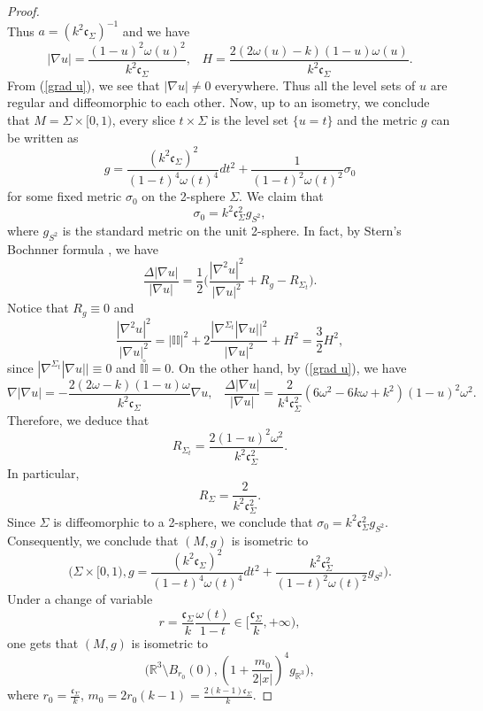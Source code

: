 \documentclass[12pt]{article}
\theoremstyle{definition}
\theoremstyle{plain}
\numberwithin{equation}{section}
\begin{document}
\begin{proof}
$$$$
Thus $ a=(k^{2}\mathfrak{c}_{\Sigma})^{-1} $ and we have
\begin{equation}\label{grad u}
|\nabla u|=\frac{(1-u)^{2}\omega(u)^{2}}{k^{2}\mathfrak{c}_{\Sigma}},\,\,\,\,\,H=\frac{2(2\omega(u)-k)(1-u)\omega(u)}{k^{2}\mathfrak{c}_{\Sigma}}.
\end{equation}
From (\ref{grad u}), we see that $ |\nabla u|\neq 0 $  everywhere. Thus all the level sets of $ u $ are regular and diffeomorphic to each other. Now, up to an isometry, we conclude that $ M=\Sigma \times [0,1)  $, every slice $ {t}\times \Sigma $ is the level set $ \{u=t\} $ and the metric $ g $ can be written as 
$$
g=\frac{(k^{2}\mathfrak{c}_{\Sigma})^{2}}{(1-t)^{4}\omega(t)^{4}}dt^{2}+\frac{1}{(1-t)^{2}\omega(t)^{2}}\sigma_{0}
$$
for some fixed metric $ \sigma_{0} $ on the 2-sphere $ \Sigma $. We claim that 
$$
\sigma_{0}=k^{2}\mathfrak{c}_{\Sigma}^{2}g_{S^{2}},
$$
where $ g_{S^{2}} $ is the standard metric on the unit 2-sphere. In fact, by Stern's Bochnner formula \cite{Stern}, we have 
$$
\frac{\Delta |\nabla u|}{|\nabla u|}=\frac{1}{2}\Big(\frac{|\nabla^{2}u|^{2}}{|\nabla u|^{2}}+R_{g}-R_{\Sigma_{t}}\Big).
$$
Notice that $ R_{g}\equiv 0 $ and 
$$
\frac{|\nabla^{2}u|^{2}}{|\nabla u|^{2}}=|\mathbb{II}|^{2}+2\frac{|\nabla^{\Sigma_{t}}|\nabla u||^{2}}{|\nabla u|^{2}}+H^{2}=\frac{3}{2}H^{2},
$$
since $ |\nabla^{\Sigma_{t}}|\nabla u||\equiv0 $ and $ \overset{\circ}{\mathbb{II}}=0 $. On the other hand, by (\ref{grad u}), we have 
$$
\nabla |\nabla u|=-\frac{2(2\omega-k)(1-u)\omega}{k^{2}\mathfrak{c}_{\Sigma}}\nabla u,\,\,\,\,\,\frac{\Delta |\nabla u|}{|\nabla u|}=\frac{2}{k^{4}\mathfrak{c}_{\Sigma}^{2}}(6\omega^{2}-6k\omega+k^{2})(1-u)^{2}\omega^{2}.
$$
Therefore, we deduce that 
$$
R_{\Sigma_{t}}=\frac{2(1-u)^{2}\omega^{2}}{k^{2}\mathfrak{c}_{\Sigma}^{2}}.
$$
In particular, 
$$ 
R_{\Sigma}=\frac{2}{k^{2}\mathfrak{c}_{\Sigma}^{2}}. 
$$
Since $ \Sigma $ is diffeomorphic to a 2-sphere, we conclude that $
\sigma_{0}=k^{2}\mathfrak{c}_{\Sigma}^{2}g_{S^{2}} $. Consequently, we conclude that $ (M,g) $ is isometric to   
$$
\Big(\Sigma \times [0,1), g=\frac{(k^{2}\mathfrak{c}_{\Sigma})^{2}}{(1-t)^{4}\omega(t)^{4}}dt^{2}+\frac{k^{2}\mathfrak{c}_{\Sigma}^{2}}{(1-t)^{2}\omega(t)^{2}}g_{S^{2}} \Big).
$$
Under a change of variable 
$$
r=\frac{\mathfrak{c}_{\Sigma}}{k}\frac{\omega(t)}{1-t}\in [\frac{\mathfrak{c}_{\Sigma}}{k}, +\infty), 
$$
one gets that $ (M,g) $ is isometric to 
$$
\Big(\mathbb{R}^{3}\setminus B_{r_{0}}(0),(1+\frac{m_{0}}{2|x|})^{4}g_{\mathbb{R}^{3}} \Big),
$$
where  $ r_{0}=\frac{\mathfrak{c}_{\Sigma}}{k} $, $ m_{0}=2r_{0}(k-1)=\frac{2(k-1)\mathfrak{c}_{\Sigma}}{k} $.
\end{proof}
\end{document}
